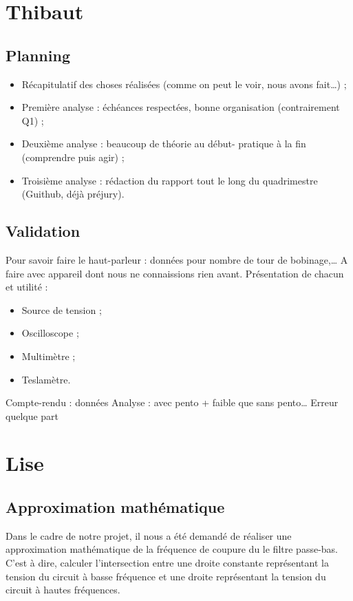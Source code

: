 \documentclass{article}
\begin{document}
\section{Thibaut}
\subsection{Planning}

\begin{itemize}
	\item Récapitulatif des choses réalisées (comme on peut le voir, nous avons fait…) ;
	\item Première analyse : échéances respectées, bonne organisation (contrairement Q1) ;
	\item Deuxième analyse : beaucoup de théorie au début- pratique à la fin  (comprendre puis agir) ;
	\item Troisième analyse : rédaction du rapport tout le long du quadrimestre (Guithub, déjà préjury).
\end{itemize}

\subsection{Validation}
Pour savoir faire le haut-parleur : données pour nombre de tour de bobinage,…  A faire avec appareil dont nous ne connaissions rien avant.
Présentation de chacun et utilité :
\begin{itemize}
	\item Source de tension ;
	\item Oscilloscope ;
	\item Multimètre ;
	\item Teslamètre.
\end{itemize}

Compte-rendu : données 
Analyse : avec pento + faible que sans pento…  Erreur quelque part

\section{Lise}
\subsection{Approximation mathématique}

Dans le cadre de notre projet, il nous a été demandé de réaliser une approximation mathématique de la fréquence de coupure
du le filtre passe-bas. C'est à dire, calculer l'intersection entre une droite constante représentant la tension du circuit à basse fréquence et une droite représentant la tension du circuit à hautes fréquences. 
\end{document}

